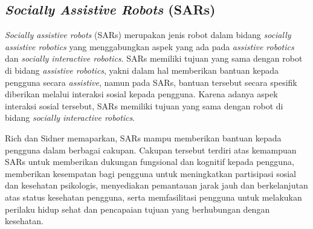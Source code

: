 \subsection{\emph{Socially Assistive Robots} (SARs)}
\label{subsec:sociallyassistiverobots}

\emph{Socially assistive robots} (SARs) merupakan jenis robot dalam bidang \emph{socially assistive robotics} yang menggabungkan aspek yang ada pada \emph{assistive robotics} dan \emph{socially interactive robotics}.
SARs memiliki tujuan yang sama dengan robot di bidang \emph{assistive robotics},
  yakni dalam hal memberikan bantuan kepada pengguna secara \emph{assistive}, namun pada SARs,
  bantuan tersebut secara spesifik diberikan melalui interaksi sosial kepada pengguna.
Karena adanya aspek interaksi sosial tersebut, SARs memiliki tujuan yang sama dengan robot di bidang \emph{socially interactive robotics}.

Rich dan Sidner \citep{cit:rich2009} memaparkan,
  SARs mampu memberikan bantuan kepada pengguna dalam berbagai cakupan.
Cakupan tersebut terdiri atas kemampuan SARs untuk memberikan dukungan fungsional dan kognitif kepada pengguna,
  memberikan kesempatan bagi pengguna untuk meningkatkan partisipasi sosial dan kesehatan psikologis,
  menyediakan pemantauan jarak jauh dan berkelanjutan atas status kesehatan pengguna,
  serta memfasilitasi pengguna untuk melakukan perilaku hidup sehat dan pencapaian tujuan yang berhubungan dengan kesehatan.
